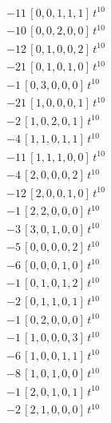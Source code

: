 \begin{align*}
-11\,[0,0,1,1,1]\,t^{10} \\
-10\,[0,0,2,0,0]\,t^{10} \\
-12\,[0,1,0,0,2]\,t^{10} \\
-21\,[0,1,0,1,0]\,t^{10} \\
-1\,[0,3,0,0,0]\,t^{10} \\
-21\,[1,0,0,0,1]\,t^{10} \\
-2\,[1,0,2,0,1]\,t^{10} \\
-4\,[1,1,0,1,1]\,t^{10} \\
-11\,[1,1,1,0,0]\,t^{10} \\
-4\,[2,0,0,0,2]\,t^{10} \\
-12\,[2,0,0,1,0]\,t^{10} \\
-1\,[2,2,0,0,0]\,t^{10} \\
-3\,[3,0,1,0,0]\,t^{10} \\
-5\,[0,0,0,0,2]\,t^{10} \\
-6\,[0,0,0,1,0]\,t^{10} \\
-1\,[0,1,0,1,2]\,t^{10} \\
-2\,[0,1,1,0,1]\,t^{10} \\
-1\,[0,2,0,0,0]\,t^{10} \\
-1\,[1,0,0,0,3]\,t^{10} \\
-6\,[1,0,0,1,1]\,t^{10} \\
-8\,[1,0,1,0,0]\,t^{10} \\
-1\,[2,0,1,0,1]\,t^{10} \\
-2\,[2,1,0,0,0]\,t^{10}
\end{align*}
